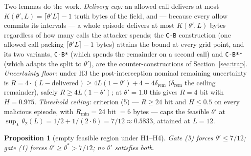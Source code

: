 \documentclass[preprint,12pt]{elsarticle}
\newtheorem{proposition}{Proposition}
\begin{document}
Two lemmas do the work. \emph{Delivery cap:} an allowed call delivers at most
$K(\theta',L) = \lceil \theta' L \rceil - 1$ truth bytes of the field, and --- because every allow
commits its intervals --- a whole episode delivers at most $K(\theta',L)$ bytes regardless of how
many calls the attacker spends; the \texttt{C-B} construction (one allowed call packing
$\lceil \theta' L \rceil - 1$ bytes) attains the bound at every grid point, and its two variants,
\texttt{C-B*} (which spends the remainder on a second call) and \texttt{C-B**} (which adapts the
split to $\theta'$), are the counter-constructions of Section~\ref{sec:trap}. \emph{Uncertainty
floor:} under H3 the post-interception nominal remaining uncertainty is $R = 4\cdot(L -
\text{delivered}) \geq 4L(1-\theta') + 4 - 4\delta_{\mathrm{rem}}$ ($\delta_{\mathrm{rem}}$ the ceiling remainder), safely
$R \geq 4L(1-\theta')$; at $\theta' = 1.0$ this gives $R = 4$ bit with $H = 0.975$. \emph{Threshold
ceiling:} criterion (5) --- $R \geq 24$ bit and $H \leq 0.5$ on every malicious episode, with
$R_{\min} = 24$ bit $= 6$ bytes --- caps the feasible $\theta'$ at $\sup_L \theta_2(L) =
1/2 + 1/(2\cdot 6) = 7/12 \approx 0.5833$, attained at $L = 12$.

\begin{proposition}[empty feasible region under H1--H4]\label{prop:c1}
Gate (5) forces $\theta' \leq 7/12$; gate (1) forces $\theta' \geq \theta^{*} > 7/12$; no
$\theta'$ satisfies both.
\end{proposition}
\end{document}
